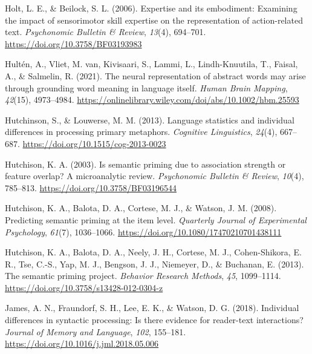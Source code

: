 \documentclass[
  12pt,
  man,floatsintext]{apa7}
\newlength{\cslhangindent}
\newlength{\cslentryspacingunit} %
\newenvironment{CSLReferences}[2] %
 {%
  \setlength{\parindent}{0pt}
  \ifodd #1
  \let\oldpar\par
  \def\par{\hangindent=\cslhangindent\oldpar}
  \fi
  \setlength{\parskip}{#2\cslentryspacingunit}
 }%
 {}
\begin{document}
\begin{CSLReferences}{1}{0}
\leavevmode{}%
Holt, L. E., \& Beilock, S. L. (2006). Expertise and its embodiment: {Examining} the impact of sensorimotor skill expertise on the representation of action-related text. \emph{Psychonomic Bulletin \& Review}, \emph{13}(4), 694--701. \url{https://doi.org/10.3758/BF03193983}

\leavevmode{}%
Hultén, A., Vliet, M. van, Kivisaari, S., Lammi, L., Lindh-Knuutila, T., Faisal, A., \& Salmelin, R. (2021). The neural representation of abstract words may arise through grounding word meaning in language itself. \emph{Human Brain Mapping}, \emph{42}(15), 4973--4984. \url{https://onlinelibrary.wiley.com/doi/abs/10.1002/hbm.25593}

\leavevmode{}%
Hutchinson, S., \& Louwerse, M. M. (2013). Language statistics and individual differences in processing primary metaphors. \emph{Cognitive Linguistics}, \emph{24}(4), 667--687. \url{https://doi.org/10.1515/cog-2013-0023}

\leavevmode{}%
Hutchison, K. A. (2003). Is semantic priming due to association strength or feature overlap? {A} microanalytic review. \emph{Psychonomic Bulletin \& Review}, \emph{10}(4), 785--813. \url{https://doi.org/10.3758/BF03196544}

\leavevmode{}%
Hutchison, K. A., Balota, D. A., Cortese, M. J., \& Watson, J. M. (2008). Predicting semantic priming at the item level. \emph{Quarterly Journal of Experimental Psychology}, \emph{61}(7), 1036--1066. \url{https://doi.org/10.1080/17470210701438111}

\leavevmode{}%
Hutchison, K. A., Balota, D. A., Neely, J. H., Cortese, M. J., Cohen-Shikora, E. R., Tse, C.-S., Yap, M. J., Bengson, J. J., Niemeyer, D., \& Buchanan, E. (2013). The semantic priming project. \emph{Behavior Research Methods}, \emph{45}, 1099--1114. \url{https://doi.org/10.3758/s13428-012-0304-z}

\leavevmode{}%
James, A. N., Fraundorf, S. H., Lee, E. K., \& Watson, D. G. (2018). Individual differences in syntactic processing: {Is} there evidence for reader-text interactions? \emph{Journal of Memory and Language}, \emph{102}, 155--181. \url{https://doi.org/10.1016/j.jml.2018.05.006}


\end{CSLReferences}
\end{document}
